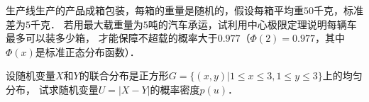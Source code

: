 \documentclass[plain,noanswer,medmath]{../../template/jnuexam}
\begin{document}

\begin{problem}
生产线生产的产品成箱包装，每箱的重量是随机的，假设每箱平均重$50$千克，标准差为$5$千克．
若用最大载重量为$5$吨的汽车承运，试利用中心极限定理说明每辆车最多可以装多少箱，
才能保障不超载的概率大于$0.977$（$\Phi (2) = 0.977$，其中$\Phi (x)$是标准正态分布函数）．
\end{problem}



\begin{problem}
设随机变量$X$和$Y$的联合分布是正方形$G = \{(x,y)|1 \le x \le 3,1 \le y \le 3\}$上的均匀分布，
试求随机变量$U = |X - Y|$的概率密度$p(u)$．
\end{problem}
\end{document}
